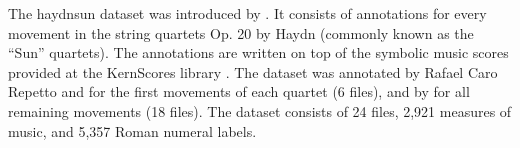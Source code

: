 

The \gls{haydnsun} dataset was introduced by
\textcite{napoleslopez2017automatic}. It consists of
annotations for every movement in the string quartets Op. 20
by Haydn (commonly known as the ``Sun'' quartets). The
annotations are written on top of the symbolic music scores
provided at the KernScores library
\parencite{sapp2005online}. The dataset was annotated by
Rafael Caro Repetto and \myself{} for the first movements of
each quartet (6 files), and by \myself{} for all remaining
movements (18 files). The dataset consists of 24 files,
2,921 measures of music, and 5,357 Roman numeral labels. 
